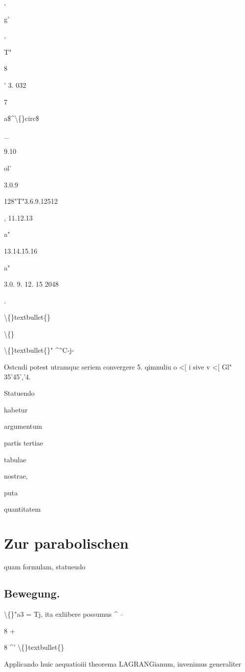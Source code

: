 \documentclass[10pt,a4paper]{article}
\begin{document}
,

g'

,

T"

8

' 3. 032

7

a\$\textasciicircum{}\textbackslash\{\}circ\$

\_

9.10

ol'

3.0.9

128"T"3.6.9.12512

, 11.12.13

a"

13.14.15.16

a"

3.0. 9. 12. 15 2048

.

\textbackslash\{\}textbullet\{\}

\textbackslash\{\}

\textbackslash\{\}textbullet\{\}" \textasciicircum{}''C-j-

Ostcndi potest utramquc seriem convergere
5. qimnuliu o <[ i sive v <[ Gl" 35'45','4.

Statuendo

habetur

argumentum

partis tertiae

tabulae

nostrae,

puta

quantitatem

\newpage
\section*{Zur parabolischen}

quam formulam, statueudo

\subsection*{Bewegung.}


\textbackslash\{\}"a3 = Tj, ita exliibere possumus
\textasciicircum{} --

8 +

8 \textasciicircum{}' \textbackslash\{\}textbullet\{\}

Applicando huic aequatioiii theorema LAGRANGianum, invenimus generaliter
\end{document}
